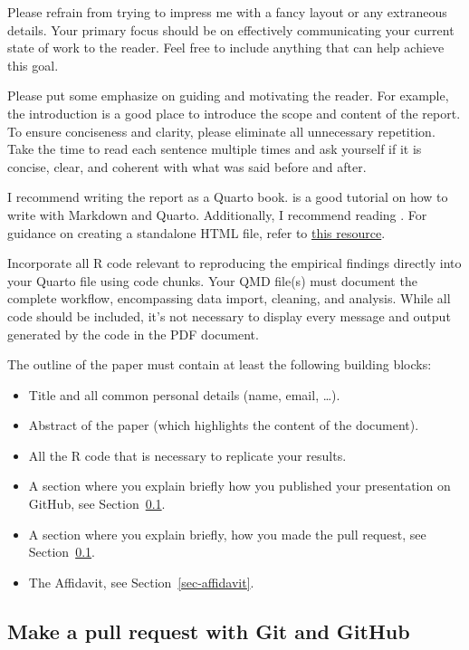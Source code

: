 \documentclass[
  a4paper,
  onecolumn,
  oneside]{scrartcl}
\providecommand{\tightlist}{%
  \setlength{\itemsep}{0pt}\setlength{\parskip}{0pt}}\usepackage{longtable,booktabs,array}
\begin{document}
Please refrain from trying to impress me with a fancy layout or any
extraneous details. Your primary focus should be on effectively
communicating your current state of work to the reader. Feel free to
include anything that can help achieve this goal.

Please put some emphasize on guiding and motivating the reader. For
example, the introduction is a good place to introduce the scope and
content of the report. To ensure conciseness and clarity, please
eliminate all unnecessary repetition. Take the time to read each
sentence multiple times and ask yourself if it is concise, clear, and
coherent with what was said before and after.

I recommend writing the report as a Quarto book.
\citet{Telford2023Markdown} is a good tutorial on how to write with
Markdown and Quarto. Additionally, I recommend reading
\citet{Huber2024Data}. For guidance on creating a standalone HTML file,
refer to
\href{https://quarto.org/docs/output-formats/html-publishing.html\#standalone-html}{this
resource}.

Incorporate all R code relevant to reproducing the empirical findings
directly into your Quarto file using code chunks. Your QMD file(s) must
document the complete workflow, encompassing data import, cleaning, and
analysis. While all code should be included, it's not necessary to
display every message and output generated by the code in the PDF
document.

The outline of the paper must contain at least the following building
blocks:

\begin{itemize}
\tightlist
\item
  Title and all common personal details (name, email, \ldots).
\item
  Abstract of the paper (which highlights the content of the document).
\item
  All the R code that is necessary to replicate your results.
\item
  A section where you explain briefly how you published your
  presentation on GitHub, see Section~\ref{sec-gitgithub}.
\item
  A section where you explain briefly, how you made the pull request,
  see Section~\ref{sec-gitgithub}.
\item
  The Affidavit, see Section~\ref{sec-affidavit}.
\end{itemize}

\subsection{Make a pull request with Git and
GitHub}\label{sec-gitgithub}
\end{document}
